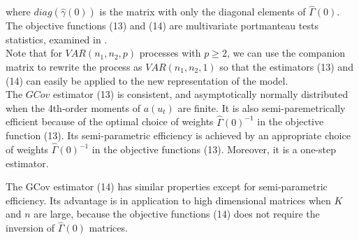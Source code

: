 \documentclass[<1p>]{elsarticle} %
\begin{document}
where $diag(\hat{\gamma}(0))$ is the matrix with only the diagonal elements of $\hat{\Gamma}(0)$. The objective functions (13) and (14) are multivariate portmanteau tests statistics, examined in \cite{cubadda2011testing}.\\
\indent Note that for $VAR(n_1, n_2, p)$ processes with $p \geq 2$, we can use the companion matrix to rewrite the process as $VAR(n_1, n_2, 1)$ so that the estimators (13) and (14) can easily be applied to the new representation of the model.\\
\indent The $GCov$ estimator (13) is consistent, and asymptotically normally distributed when the 4th-order moments of $a(u_t)$ are finite. 
It is also semi-paremetrically efficient because of the optimal choice of weights $\widehat{\Gamma}(0)^{-1}$ in the objective function (13). Its semi-parametric efficiency is achieved by an appropriate choice of weights $\widehat{\Gamma}(0)^{-1}$ in the objective functions (13). Moreover, it is a one-step estimator.

The GCov estimator (14) has similar properties except for semi-parametric efficiency. Its advantage is in application to high dimensional matrices when $K$ and $n$ are large, because the objective functions (14) does not require the inversion of $\hat{\Gamma}(0)$ matrices.
\end{document}
